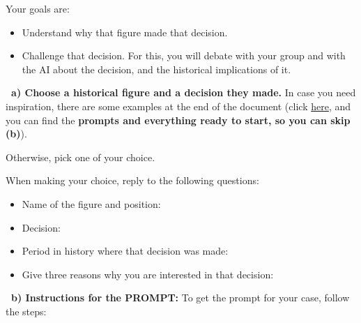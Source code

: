 \documentclass[12pt]{article}
\newcounter{exercise}
\newcommand{\exercisetitle}[1]{%
\stepcounter{exercise}
  \vspace{0.5cm}
  \colorbox{maincolor}{%
    \makebox[\dimexpr\linewidth-2\fboxsep][l]{%
      \textcolor{white}{\faPen\ Assignment \theexercise #1}%
    }%
  }
  \vspace{0.3cm}
}
\newcounter{question}
\begin{document}
Your goals are:

\begin{itemize}
    \item Understand why that figure made that decision.
    \item Challenge that decision. For this, you will debate with your group and with the AI about the decision, and the historical implications of it.
\end{itemize}


\exercisetitle{: Choice of historical figure and decision}

\textcolor{maincolor}{\textbf{\faPen\ a) Choose a historical figure and a decision they made. }}  In case you need inspiration, there are some examples at the end of the document (click \hyperref[sec:examples]{here}, and you can find the \textbf{prompts and everything ready to start, so you can skip (b)}).

Otherwise, pick one of your choice.

When making your choice, reply to the following questions:

\begin{Form}
\begin{itemize}
    \item Name of the figure and position: \\[0.2cm]
\TextField[name=figpos,width=\linewidth,height=0.4cm,multiline=true, bordercolor={0 0 0}]{}
    \item Decision: \\[0.2cm]
\TextField[name=decision,width=\linewidth,height=0.4cm,multiline=true, bordercolor={0 0 0}]{}
    \item Period in history where that decision was made: \\[0.2cm]
\TextField[name=period,width=\linewidth,height=0.4cm,multiline=true, bordercolor={0 0 0}]{}

    \item Give three reasons why you are interested in that decision:\\[0.2cm]
\TextField[name=reasons,width=\linewidth,height=2cm,multiline=true, bordercolor={0 0 0}]{}
\end{itemize}

\end{Form}

\textcolor{maincolor}{\textbf{\faPen\ b) Instructions for the PROMPT:}} To get the prompt for your case, follow the steps:
\end{document}
